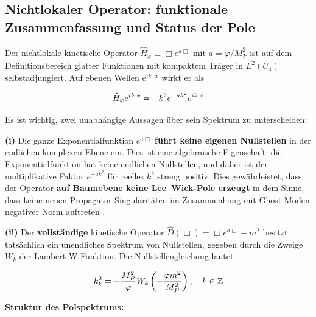 ﻿\documentclass[11pt,letterpaper]{article}
\begin{document}
\subsection{Nichtlokaler Operator: funktionale Zusammenfassung und Status der Pole}
Der nichtlokale kinetische Operator $\hat{H}_\varphi \equiv \Box e^{a\Box}$ mit $a = \varphi/M_P^2$ ist auf dem Definitionsbereich glatter Funktionen mit kompaktem Träger in $L^2(U_4)$ selbstadjungiert. Auf ebenen Wellen $e^{ik\cdot x}$ wirkt er als

\begin{equation*}
  \resizebox{\ifdim\width>\linewidth \linewidth\else\width\fi}{!}{$\displaystyle \hat{H}_\varphi e^{ik\cdot x} = -k^2 e^{-ak^2}e^{ik\cdot x}$}
\end{equation*}

Es ist wichtig, zwei unabhängige Aussagen über sein Spektrum zu unterscheiden:

\textbf{(i)} Die ganze Exponentialfunktion $e^{a\Box}$ \textbf{führt keine eigenen Nullstellen} in der endlichen komplexen Ebene ein. Dies ist eine algebraische Eigenschaft: die Exponentialfunktion hat keine endlichen Nullstellen, und daher ist der multiplikative Faktor $e^{-ak^2}$ für reelles $k^2$ streng positiv. Dies gewährleistet, dass der Operator \textbf{auf Baumebene keine Lee--Wick-Pole erzeugt} in dem Sinne, dass keine neuen Propagator-Singularitäten im Zusammenhang mit Ghost-Moden negativer Norm auftreten \cite{AnselmiPiva2017a}.

\textbf{(ii)} Der \textbf{vollständige} kinetische Operator $\hat{D}(\Box) = \Box e^{a\Box} - m^2$ besitzt tatsächlich ein unendliches Spektrum von Nullstellen, gegeben durch die Zweige $W_k$ der Lambert-W-Funktion. Die Nullstellengleichung lautet

\begin{equation*}
  \resizebox{\ifdim\width>\linewidth \linewidth\else\width\fi}{!}{$\displaystyle k_k^2 = -\frac{M_P^2}{\varphi}W_k\left(+\frac{\varphi m^2}{M_P^2}\right), \quad k \in \mathbb{Z}$}
\end{equation*}

\textbf{Struktur des Polspektrums:}

\begin{table}[htbp]
  \centering
  \small
\end{table}
\end{document}
